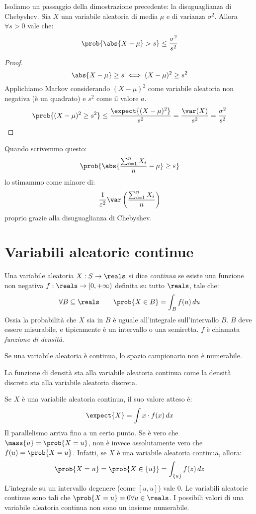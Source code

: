 Isoliamo un passaggio della dimostrazione precedente: la disuguaglianza di Chebyshev. Sia $X$ una variabile aleatoria di media $\mu$ e di varianza $\sigma^2$. Allora $\forall s > 0$ vale che:
\[
\prob{\abs{X - \mu} > s} \le \frac{\sigma^2}{s^2}
\]
\begin{proof}
\[
\abs{X - \mu} \ge s \iff (X - \mu)^2 \ge s^2
\]
Applichiamo Markov considerando $(X - \mu)^2$ come variabile aleatoria non negativa (\`e un quadrato) e $s^2$ come il valore $a$.
\[
\prob{(X - \mu)^2 \ge s^2} \le \frac{\expect{(X - \mu)^2}}{s^2} = \frac{\var (X)}{s^2} = \frac{\sigma^2}{s^2}
\]
\end{proof}

Quando scrivemmo questo:
\[
\prob{\abs{\frac{\sum_{i = 1}^{n} X_i}{n} - \mu} \ge \varepsilon}
\]
lo stimammo come minore di:
\[
\frac{1}{\varepsilon^2} \var \left( \frac{\sum_{i = 1}^{n} X_i}{n} \right)
\]
proprio grazie alla disuguaglianza di Chebyshev.

\section{Variabili aleatorie continue}

\begin{defn}
Una variabile aleatoria $X : S \to \reals$ si dice \emph{continua} se esiste una funzione non negativa $f : \reals \to \left[ 0, + \infty \right)$ definita su tutto $\reals$, tale che:
\[
\forall B \subseteq \reals \qquad \prob{X \in B} = \int_{B} f(u) \, du
\]
Ossia la probabilit\`a che $X$ sia in $B$ \`e uguale all'integrale sull'intervallo $B$. $B$ deve essere misurabile, e tipicamente \`e un intervallo o una semiretta. $f$ \`e chiamata \emph{funzione di densit\`a}.
\end{defn}

Se una variabile aleatoria \`e continua, lo spazio campionario non \`e numerabile.

La funzione di densit\`a sta alla variabile aleatoria continua come la densit\`a discreta sta alla variabile aleatoria discreta.

Se $X$ \`e una variabile aleatoria continua, il suo valore atteso \`e:
\[
\expect{X} = \int x \cdot f(x) \, dx
\]
Il parallelismo arriva fino a un certo punto. Se \`e vero che $\mass{u} = \prob{X = u}$, non \`e invece assolutamente vero che $f(u) = \prob{X = u}$. Infatti, se $X$ \`e una variabile aleatoria continua, allora:
\[
\prob{X = u} = \prob{X \in \{u\}} = \int_{\{u\}} f(z) \, dz
\]
L'integrale su un intervallo degenere (come $[u,u]$) vale 0. Le variabili aleatorie continue sono tali che $\prob{X = u} = 0 \forall u \in \reals$. I possibili valori di una variabile aleatoria continua non sono un insieme numerabile.

